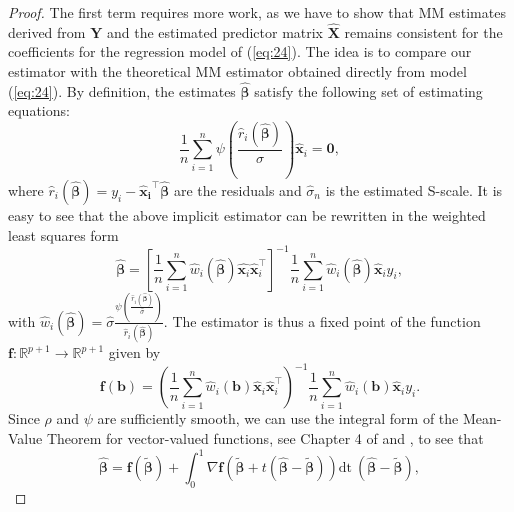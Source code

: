 \documentclass[11pt]{article}
\begin{document}
\begin{proof}
The first term requires more work, as we have to show that MM estimates derived from $\mathbf{Y}$ and the estimated predictor matrix $\widehat{\mathbf{X}}$ remains consistent for the coefficients for the regression model of (\ref{eq:24}). The idea is to compare our estimator with the theoretical MM estimator obtained directly from model (\ref{eq:24}). By definition, the estimates $\boldsymbol{\widehat{\beta}}$ satisfy the following set of estimating equations:
\begin{equation}
\frac{1}{n} \sum_{i=1}^n \psi \left( \frac{\widehat{r}_i \left( \boldsymbol{\widehat{\beta}} \right)}{\widehat{\sigma}} \right) \mathbf{\widehat{x}}_i = \mathbf{0},
\end{equation}
where $\widehat{r}_i ( \boldsymbol{\widehat{\beta}} ) = y_i - \mathbf{\widehat{x}_i}^{\top} \boldsymbol{\widehat{\beta}}$ are the residuals and $\widehat{\sigma}_n$ is the estimated S-scale. It is easy to see that the above implicit estimator can be rewritten in the weighted least squares form
\begin{equation}
\boldsymbol{\widehat{\beta}} = \left[ \frac{1}{n} \sum_{i=1}^n  \widehat{w}_i \left( \boldsymbol{\widehat{\beta}} \right)   \widehat{\mathbf{x}_i} \widehat{\mathbf{x}}_i^{\top} \right]^{-1} \frac{1}{n} \sum_{i=1}^n  \widehat{w}_i \left( \boldsymbol{\widehat{\beta}} \right) \mathbf{\widehat{x}}_i y_i,
\end{equation}
with $\widehat{w}_i \left( \boldsymbol{\widehat{\beta}} \right) = \widehat{\sigma} \frac{ \psi \left( \frac{\widehat{r}_i \left( \boldsymbol{\widehat{\beta}} \right)}{\widehat{\sigma}} \right) }{ \widehat{r}_i \left( \boldsymbol{\widehat{\beta}} \right)} $. The estimator is thus a fixed point of the function $\mathbf{f}: \mathbb{R}^{p+1} \to \mathbb{R}^{p+1}$ given by
\begin{equation}
\mathbf{f} \left( \mathbf{b} \right) = \left( \frac{1}{n} \sum_{i=1}^n  \widehat{w}_i \left( \boldsymbol{b} \right)   \widehat{\mathbf{x}}_i \widehat{\mathbf{x}}_i^{\top} \right)^{-1} \frac{1}{n} \sum_{i=1}^n  \widehat{w}_i \left( \boldsymbol{b} \right) \mathbf{\widehat{x}}_i y_i.
\end{equation}
Since $\rho$ and $\psi$ are sufficiently smooth, we can use the integral form of the Mean-Value Theorem for vector-valued functions, see Chapter 4 of \citep{ferguson2017course} and \citep{feng2014exact}, to see that  
\begin{equation}
\boldsymbol{\widehat{\beta}} = \mathbf{f} ( \boldsymbol{\widetilde{\beta}} ) + \int_{0}^1  \nabla \mathbf{f} \left (\boldsymbol{\widetilde{\beta}} + t \left( \boldsymbol{\widehat{\beta}}-\boldsymbol{\widetilde{\beta}} \right) \right) \mathrm{dt} \  (\boldsymbol{\widehat{\beta}} - \boldsymbol{\widetilde{\beta}} ),  

\end{equation}
\end{proof}
\end{document}
